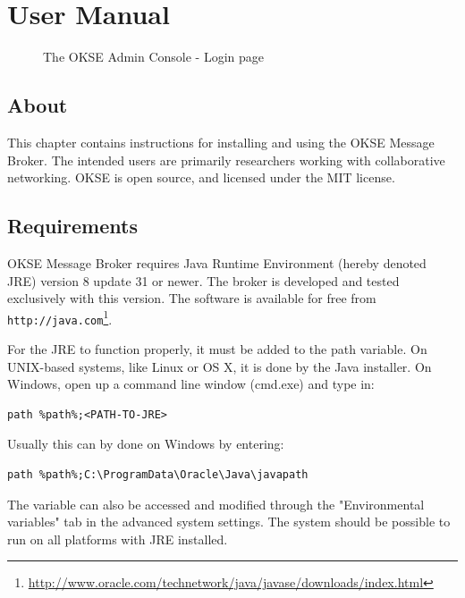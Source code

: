 \chapter{User Manual}
\label{appendix-user-manual}

\begin{center}
  \begin{figure}[ht!]
    \caption{The OKSE Admin Console - Login page} 
    \label{fig:OKSE Admin Console login page}
  \end{figure}
\end{center}

\section{About}

This chapter contains instructions for installing and using the OKSE Message Broker. The intended users are primarily researchers working with collaborative networking. OKSE is open source, and licensed under the MIT license.

\section{Requirements}

OKSE Message Broker requires Java Runtime Environment (hereby denoted JRE) version 8 update 31 or newer. The broker is developed and tested exclusively with this version. The software is available for free from \verb!http://java.com!\footnote{\url{http://www.oracle.com/technetwork/java/javase/downloads/index.html}}.

For the JRE to function properly, it must be added to the path variable. On UNIX-based systems, like Linux or OS X, it is done by the Java installer. On Windows, open up a command line window (cmd.exe) and type in:
\begin{verbatim}
path %path%;<PATH-TO-JRE>
\end{verbatim}
Usually this can by done on Windows by entering:
\begin{verbatim}
path %path%;C:\ProgramData\Oracle\Java\javapath
\end{verbatim}
The variable can also be accessed and modified through the "Environmental variables" tab in the advanced system settings. The system should be possible to run on all platforms with JRE installed. 

